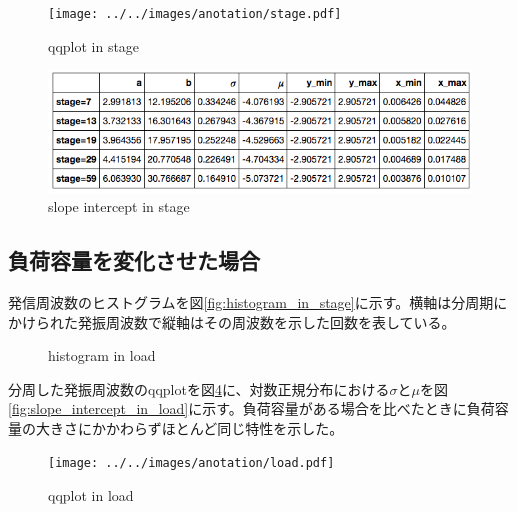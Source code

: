 \documentclass{jsarticle}
\begin{document}
\begin{figure}[hbtp]
	\centering
	\texttt{[image: ../../images/anotation/stage.pdf]}
	\caption{qqplot in stage}
	\label{fig:qqplot_in_stage}
\end{figure}

\begin{figure}[hbtp]
	\centering
	\includegraphics[width=13cm]{../../least_squares/stage.png}
	\caption{slope intercept in stage}
	\label{fig:slope_intercept_in_stage}
\end{figure}

\subsection{負荷容量を変化させた場合}
\label{sec:result_stage}

発信周波数のヒストグラムを図\ref{fig:histogram_in_stage}に示す。横軸は分周期にかけられた発振周波数で縦軸はその周波数を示した回数を表している。

\begin{figure}[hbtp]
	\centering
	\caption{histogram in load}
	\label{fig:histogram_in_load}
\end{figure}

分周した発振周波数のqqplotを図\ref{fig:qqplot_in_load}に、対数正規分布における$\sigma$と$\mu$を図\ref{fig:slope_intercept_in_load}に示す。負荷容量がある場合を比べたときに負荷容量の大きさにかかわらずほとんど同じ特性を示した。

\begin{figure}[hbtp]
	\centering
	\texttt{[image: ../../images/anotation/load.pdf]}
	\caption{qqplot in load}
	\label{fig:qqplot_in_load}
\end{figure}
\end{document}
